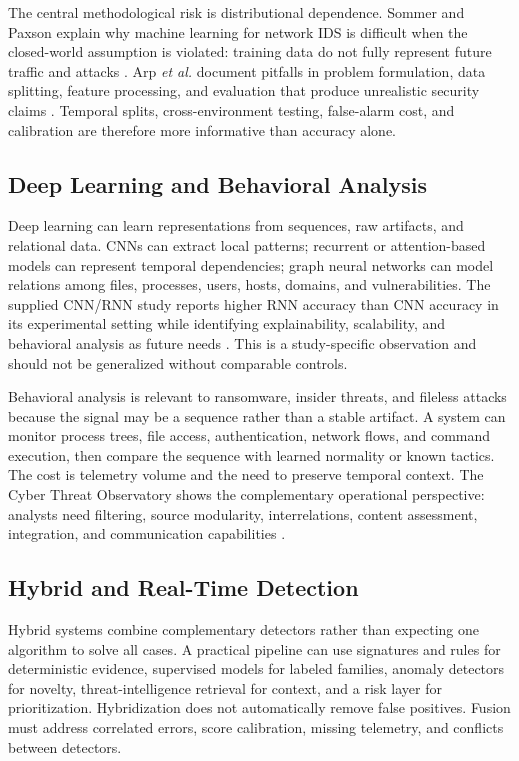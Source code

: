\documentclass[conference]{IEEEtran}
\begin{document}
The central methodological risk is distributional dependence. Sommer and Paxson explain why machine learning for network IDS is difficult when the closed-world assumption is violated: training data do not fully represent future traffic and attacks \cite{SommerPaxson}. Arp \emph{et al.} document pitfalls in problem formulation, data splitting, feature processing, and evaluation that produce unrealistic security claims \cite{Arp2022}. Temporal splits, cross-environment testing, false-alarm cost, and calibration are therefore more informative than accuracy alone.

\subsection{Deep Learning and Behavioral Analysis}
Deep learning can learn representations from sequences, raw artifacts, and relational data. CNNs can extract local patterns; recurrent or attention-based models can represent temporal dependencies; graph neural networks can model relations among files, processes, users, hosts, domains, and vulnerabilities. The supplied CNN/RNN study reports higher RNN accuracy than CNN accuracy in its experimental setting while identifying explainability, scalability, and behavioral analysis as future needs \cite{Rajendran2024}. This is a study-specific observation and should not be generalized without comparable controls.

Behavioral analysis is relevant to ransomware, insider threats, and fileless attacks because the signal may be a sequence rather than a stable artifact. A system can monitor process trees, file access, authentication, network flows, and command execution, then compare the sequence with learned normality or known tactics. The cost is telemetry volume and the need to preserve temporal context. The Cyber Threat Observatory shows the complementary operational perspective: analysts need filtering, source modularity, interrelations, content assessment, integration, and communication capabilities \cite{Kaufhold2022}.

\subsection{Hybrid and Real-Time Detection}
Hybrid systems combine complementary detectors rather than expecting one algorithm to solve all cases. A practical pipeline can use signatures and rules for deterministic evidence, supervised models for labeled families, anomaly detectors for novelty, threat-intelligence retrieval for context, and a risk layer for prioritization. Hybridization does not automatically remove false positives. Fusion must address correlated errors, score calibration, missing telemetry, and conflicts between detectors.
\end{document}

